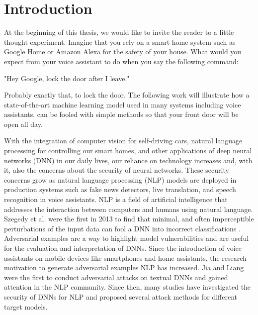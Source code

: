 
\section{Introduction}

At the beginning of this thesis, we would like to invite the reader to a little thought experiment. Imagine that you rely on a smart home system such as Google Home or Amazon Alexa for the safety of your house. What would you expect from your voice assistant to do when you say the following command:

"Hey Google, lock the door after I leave."

Probably exactly that, to lock the door. The following work will illustrate how a state-of-the-art machine learning model used in many systems including voice assistants, can be fooled with simple methods so that your front door will be open all day. 

With the integration of computer vision for self-driving cars, natural language processing for controlling our smart homes, and other applications of deep neural networks (DNN) in our daily lives, our reliance on technology increases and, with it, also the concerns about the security of neural networks. These security concerns grow as natural language processing (NLP) models are deployed in production systems such as fake news detectors, live translation, and speech recognition in voice assistants. NLP is a field of artificial intelligence that addresses the interaction between computers and humans using natural language.  
Szegedy et al. were the first in 2013 to find that minimal, and often imperceptible perturbations of the input data can fool a DNN into incorrect classifications \cite{szegedy2013intriguing}.
Adversarial examples are a way to highlight model vulnerabilities and are useful for the evaluation and interpretation of DNNs. 
Since the introduction of voice assistants on mobile devices like smartphones and home assistants, the research motivation to generate adversarial examples NLP has increased. Jia and Liang were the first to conduct adversarial attacks on textual DNNs and gained attention in the NLP community\cite{Jia2017AdversarialEF}. Since then, many studies have investigated the security of DNNs for NLP and proposed several attack methods for different target models. 

